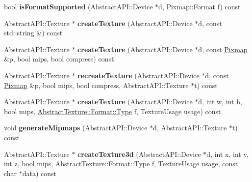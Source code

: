 \begin{DoxyCompactItemize}
\item 
\hypertarget{class_tempest_1_1_opengl2x_a897c816674832bf85702dc6dc0c3e60b}{bool {\bfseries is\+Format\+Supported} (Abstract\+A\+P\+I\+::\+Device $\ast$d, Pixmap\+::\+Format f) const }\label{class_tempest_1_1_opengl2x_a897c816674832bf85702dc6dc0c3e60b}

\item 
\hypertarget{class_tempest_1_1_opengl2x_a119931c4eee3294455c4db27598b3d64}{Abstract\+A\+P\+I\+::\+Texture $\ast$ {\bfseries create\+Texture} (Abstract\+A\+P\+I\+::\+Device $\ast$d, const std\+::string \&) const }\label{class_tempest_1_1_opengl2x_a119931c4eee3294455c4db27598b3d64}

\item 
\hypertarget{class_tempest_1_1_opengl2x_a95e6a4d05d04a4733880e3b411a7755d}{Abstract\+A\+P\+I\+::\+Texture $\ast$ {\bfseries create\+Texture} (Abstract\+A\+P\+I\+::\+Device $\ast$d, const \hyperlink{class_tempest_1_1_pixmap}{Pixmap} \&p, bool mips, bool compress) const }\label{class_tempest_1_1_opengl2x_a95e6a4d05d04a4733880e3b411a7755d}

\item 
\hypertarget{class_tempest_1_1_opengl2x_a946bc8baae14d69d9b525807a321098c}{Abstract\+A\+P\+I\+::\+Texture $\ast$ {\bfseries recreate\+Texture} (Abstract\+A\+P\+I\+::\+Device $\ast$d, const \hyperlink{class_tempest_1_1_pixmap}{Pixmap} \&p, bool mips, bool compress, Abstract\+A\+P\+I\+::\+Texture $\ast$t) const }\label{class_tempest_1_1_opengl2x_a946bc8baae14d69d9b525807a321098c}

\item 
\hypertarget{class_tempest_1_1_opengl2x_aa2a0e73cde0ffc3c5bdbe465a3825f4e}{Abstract\+A\+P\+I\+::\+Texture $\ast$ {\bfseries create\+Texture} (Abstract\+A\+P\+I\+::\+Device $\ast$d, int w, int h, bool mips, \hyperlink{struct_tempest_1_1_abstract_texture_1_1_format_a231a1f516e53783bf72c713669b115b3}{Abstract\+Texture\+::\+Format\+::\+Type} f, Texture\+Usage usage) const }\label{class_tempest_1_1_opengl2x_aa2a0e73cde0ffc3c5bdbe465a3825f4e}

\item 
\hypertarget{class_tempest_1_1_opengl2x_a25036e6df4a67b56293ab0d8fb006996}{void {\bfseries generate\+Mipmaps} (Abstract\+A\+P\+I\+::\+Device $\ast$d, Abstract\+A\+P\+I\+::\+Texture $\ast$t) const }\label{class_tempest_1_1_opengl2x_a25036e6df4a67b56293ab0d8fb006996}

\item 
\hypertarget{class_tempest_1_1_opengl2x_a034991613b470332000160eef6ba83ad}{Abstract\+A\+P\+I\+::\+Texture $\ast$ {\bfseries create\+Texture3d} (Abstract\+A\+P\+I\+::\+Device $\ast$d, int x, int y, int z, bool mips, \hyperlink{struct_tempest_1_1_abstract_texture_1_1_format_a231a1f516e53783bf72c713669b115b3}{Abstract\+Texture\+::\+Format\+::\+Type} f, Texture\+Usage usage, const char $\ast$data) const }\label{class_tempest_1_1_opengl2x_a034991613b470332000160eef6ba83ad}


\end{DoxyCompactItemize}
